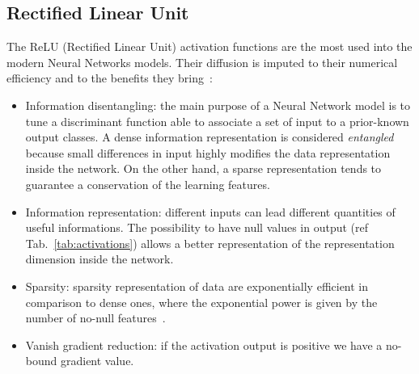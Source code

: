 \documentclass{standalone}
\begin{document}
\subsection[Relu]{Rectified Linear Unit}\label{relu}

The ReLU (Rectified Linear Unit) activation functions are the most used into the modern Neural Networks models.
Their diffusion is imputed to their numerical efficiency and to the benefits they bring~\cite{}:

\begin{itemize}

\item Information disentangling: the main purpose of a Neural Network model is to tune a discriminant function able to associate a set of input to a prior-known output classes.
A dense information representation is considered \emph{entangled} because small differences in input highly modifies the data representation inside the network.
On the other hand, a sparse representation tends to guarantee a conservation of the learning features.

\item Information representation: different inputs can lead different quantities of useful informations.
The possibility to have null values in output (ref Tab.~\ref{tab:activations}) allows a better representation of the representation dimension inside the network.

\item Sparsity: sparsity representation of data are exponentially efficient in comparison to dense ones, where the exponential power is given by the number of no-null features~\cite{}.

\item Vanish gradient reduction: if the activation output is positive we have a no-bound gradient value.

\end{itemize}
\end{document}
